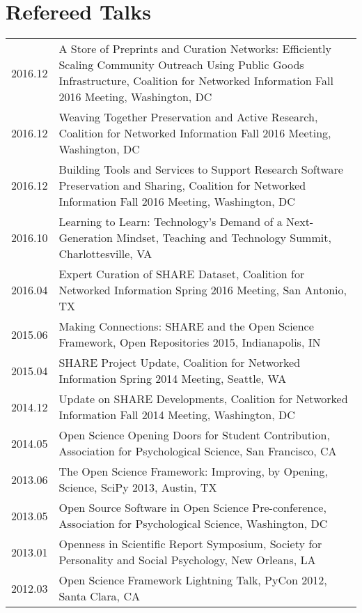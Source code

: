 \documentclass[11pt]{article}
\begin{document}
\section*{Refereed Talks}
\begin{tabularx}{\textwidth}{lX}
    2016.12    & A Store of Preprints and Curation Networks: Efficiently Scaling Community Outreach Using Public Goods Infrastructure, Coalition for Networked Information Fall 2016 Meeting, Washington, DC\\
    2016.12    & Weaving Together Preservation and Active Research, Coalition for Networked Information Fall 2016 Meeting, Washington, DC\\
    2016.12    & Building Tools and Services to Support Research Software Preservation and Sharing,  Coalition for Networked Information Fall 2016 Meeting, Washington, DC\\
    2016.10    & Learning to Learn: Technology's Demand of a Next-Generation Mindset, Teaching and Technology Summit, Charlottesville, VA\\
    2016.04    & Expert Curation of SHARE Dataset, Coalition for Networked Information Spring 2016 Meeting, San Antonio, TX\\
    2015.06    & Making Connections: SHARE and the Open Science Framework, Open Repositories 2015, Indianapolis, IN\\
    2015.04    & SHARE Project Update, Coalition for Networked Information Spring 2014 Meeting, Seattle, WA\\
    2014.12    & Update on SHARE Developments, Coalition for Networked Information Fall 2014 Meeting, Washington, DC\\
    2014.05    & Open Science Opening Doors for Student Contribution, Association for Psychological Science, San Francisco, CA\\
    2013.06    & The Open Science Framework: Improving, by Opening, Science, SciPy 2013, Austin, TX\\
    2013.05    & Open Source Software in Open Science Pre-conference, Association for Psychological Science, Washington, DC\\
    2013.01    & Openness in Scientific Report Symposium, Society for Personality and Social Psychology, New Orleans, LA\\
    2012.03    & Open Science Framework Lightning Talk, PyCon 2012, Santa Clara, CA\\
\end{tabularx}
\end{document}
